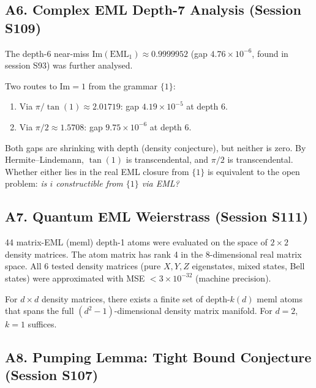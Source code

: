 \subsection*{A6. Complex EML Depth-7 Analysis (Session S109)}

The depth-6 near-miss $\mathrm{Im}(\text{EML}_1) \approx 0.9999952$
(gap $4.76 \times 10^{-6}$, found in session S93) was further analysed.

Two routes to $\mathrm{Im} = 1$ from the grammar $\{1\}$:
\begin{enumerate}
  \item Via $\pi/\tan(1) \approx 2.01719$: gap $4.19 \times 10^{-5}$ at depth 6.
  \item Via $\pi/2 \approx 1.5708$: gap $9.75 \times 10^{-6}$ at depth 6.
\end{enumerate}

Both gaps are shrinking with depth (density conjecture), but neither is
zero.  By Hermite--Lindemann, $\tan(1)$ is transcendental, and $\pi/2$
is transcendental.  Whether either lies in the real EML closure from $\{1\}$
is equivalent to the open problem: \emph{is $i$ constructible from $\{1\}$
via EML?}

\subsection*{A7. Quantum EML Weierstrass (Session S111)}

44 matrix-EML (meml) depth-1 atoms were evaluated on the space of
$2 \times 2$ density matrices. The atom matrix has rank 4 in the
8-dimensional real matrix space. All 6 tested density matrices
(pure $X,Y,Z$ eigenstates, mixed states, Bell states) were approximated
with MSE $< 3 \times 10^{-32}$ (machine precision).

\begin{conjecture}
For $d \times d$ density matrices, there exists a finite set of
depth-$k(d)$ meml atoms that spans the full $(d^2-1)$-dimensional
density matrix manifold. For $d=2$, $k=1$ suffices.
\end{conjecture}

\subsection*{A8. Pumping Lemma: Tight Bound Conjecture (Session S107)}

